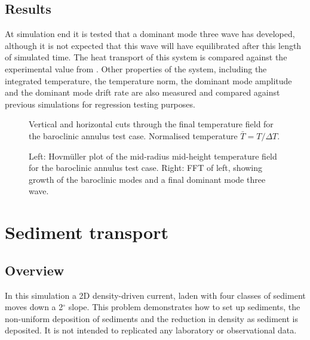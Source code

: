 \subsection{Results}

At simulation end it is tested that a dominant mode three wave has developed,
although it is not expected that this wave will have equilibrated after this
length of simulated time. The heat transport of this system is compared against
the experimental value from \citet{read2003}. Other properties of the system,
including the integrated temperature, the temperature \Ltwo norm, the dominant
mode amplitude and the dominant mode drift rate are also measured and compared
against previous simulations for regression testing purposes.

\begin{figure}[ht]
  \centering
  \caption{Vertical and horizontal cuts through the final temperature field
           for the baroclinic annulus test case. Normalised temperature
           $\bar{T} = T / \Delta T$.}
\end{figure}

\begin{figure}[ht]
  \centering
  \caption{Left: Hovm\"uller plot of the mid-radius mid-height temperature field
           for the baroclinic annulus test case. Right: FFT of left, showing
           growth of the baroclinic modes and a final dominant mode three wave.}
\end{figure}


\section{Sediment transport}
\label{sect:sediment_transport}

\subsection{Overview}

In this simulation a 2D density-driven current, laden with four classes of sediment
moves down a 2$^{\circ}$ slope. This problem demonstrates how to set up sediments, 
the non-uniform deposition of sediments and the reduction in density as sediment is
deposited. It is not intended to replicated any laboratory or observational data.

